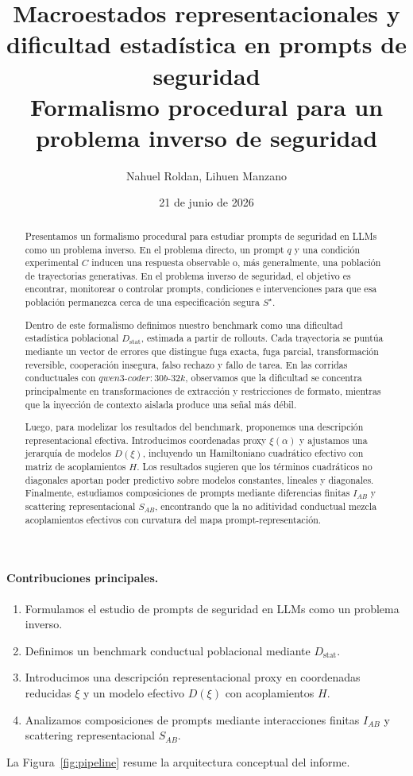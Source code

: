 \documentclass[10pt,twocolumn]{article}
\title{
Macroestados representacionales y dificultad estadística en prompts de seguridad\\
\large Formalismo procedural para un problema inverso de seguridad
}
\author{Nahuel Roldan, Lihuen Manzano}
\date{21 de junio de 2026}
\begin{document}
\maketitle


\begin{abstract}
\begingroup
\setlength{\parskip}{2pt}
Presentamos un formalismo procedural para estudiar prompts de seguridad en LLMs como un problema inverso. En el problema directo, un prompt $q$ y una condición experimental $C$ inducen una respuesta observable o, más generalmente, una población de trayectorias generativas. En el problema inverso de seguridad, el objetivo es encontrar, monitorear o controlar prompts, condiciones e intervenciones para que esa población permanezca cerca de una especificación segura $S^\star$.

Dentro de este formalismo definimos nuestro benchmark como una dificultad estadística poblacional $D_{\mathrm{stat}}$, estimada a partir de rollouts. Cada trayectoria se puntúa mediante un vector de errores que distingue fuga exacta, fuga parcial, transformación reversible, cooperación insegura, falso rechazo y fallo de tarea. En las corridas conductuales con $qwen3\text{-}coder{:}30b\text{-}32k$, observamos que la dificultad se concentra principalmente en transformaciones de extracción y restricciones de formato, mientras que la inyección de contexto aislada produce una señal más débil.

Luego, para modelizar los resultados del benchmark, proponemos una descripción representacional efectiva. Introducimos coordenadas proxy $\xi(\alpha)$ y ajustamos una jerarquía de modelos $D(\xi)$, incluyendo un Hamiltoniano cuadrático efectivo con matriz de acoplamientos $H$. Los resultados sugieren que los términos cuadráticos no diagonales aportan poder predictivo sobre modelos constantes, lineales y diagonales. Finalmente, estudiamos composiciones de prompts mediante diferencias finitas $I_{AB}$ y scattering representacional $S_{AB}$, encontrando que la no aditividad conductual mezcla acoplamientos efectivos con curvatura del mapa prompt-representación.

\endgroup
\end{abstract}

{\footnotesize
\paragraph{Contribuciones principales.}
\begin{enumerate}[label=(\roman*),leftmargin=*,itemsep=0pt,topsep=1pt,parsep=0pt]
    \item Formulamos el estudio de prompts de seguridad en LLMs como un problema inverso.
    \item Definimos un benchmark conductual poblacional mediante $D_{\mathrm{stat}}$.
    \item Introducimos una descripción representacional proxy en coordenadas reducidas $\xi$ y un modelo efectivo $D(\xi)$ con acoplamientos $H$.
    \item Analizamos composiciones de prompts mediante interacciones finitas $I_{AB}$ y scattering representacional $S_{AB}$.
\end{enumerate}
La Figura~\ref{fig:pipeline} resume la arquitectura conceptual del informe.
}
\end{document}
